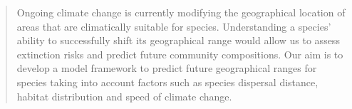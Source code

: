\documentclass[12pt,pdftex]{article}
\begin{document}
\begin{spacing}{2}
\clearpage
%

\begin{abstract}
 Ongoing climate change is currently modifying the geographical location of areas that are climatically suitable for species. Understanding a species' ability to successfully shift its geographical range would allow us to assess extinction risks and predict future community compositions. Our aim is to develop a model framework to predict future geographical ranges for species taking into account factors such as species dispersal distance, habitat distribution and speed of climate change.


\end{abstract}
\end{spacing}
\end{document}
